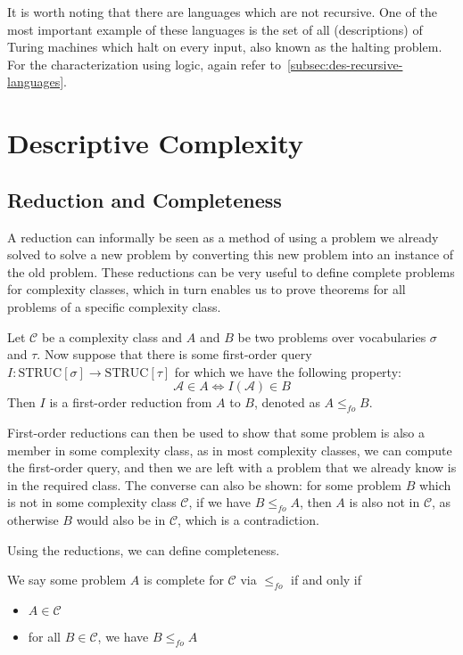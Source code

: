 It is worth noting that there are languages which are not recursive.
One of the most important example of these languages is the set of all (descriptions) of Turing machines which halt on every input, also known as the halting problem.
For the characterization using logic, again refer to~\cref{subsec:des-recursive-languages}.

\section{Descriptive Complexity}\label{sec:descriptive-complexity-context}

\subsection{Reduction and Completeness}\label{subsec:reduction}

A reduction can informally be seen as a method of using a problem we already solved to solve a new problem by converting this new problem into an instance of the old problem.
These reductions can be very useful to define complete problems for complexity classes, which in turn enables us to prove theorems for all problems of a specific complexity class.

\begin{define}
    Let $\mathcal{C}$ be a complexity class and $A$ and $B$ be two problems over vocabularies $\sigma$ and $\tau$.
    Now suppose that there is some first-order query $I: \text{STRUC}[\sigma] \to \text{STRUC}[\tau]$ for which we have the following property:
    \[
        \mathcal{A} \in A \Leftrightarrow I(\mathcal{A}) \in B
    \]
    Then $I$ is a first-order reduction from $A$ to $B$, denoted as $A \leq_{fo} B$.
\end{define}

First-order reductions can then be used to show that some problem is also a member in some complexity class, as in most complexity classes, we can compute the first-order query, and then we are left with a problem that we already know is in the required class.
The converse can also be shown: for some problem $B$ which is not in some complexity class $\mathcal{C}$, if we have $B \leq_{fo} A$, then $A$ is also not in $\mathcal{C}$, as otherwise $B$ would also be in $\mathcal{C}$, which is a contradiction.

Using the reductions, we can define completeness.

\begin{define}
    We say some problem $A$ is complete for $\mathcal{C}$ via $\leq_{fo}$ if and only if
    \begin{itemize}
        \setlength\itemsep{0.2em}
        \item $A \in \mathcal{C}$
        \item for all $B \in \mathcal{C}$, we have $B \leq_{fo} A$
    \end{itemize}
\end{define}

